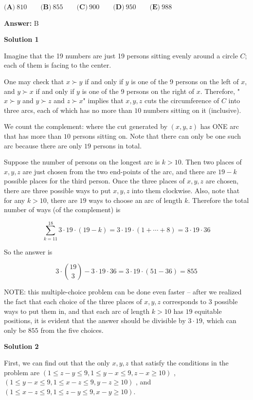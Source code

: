 \begin{enumerate}
 $\textbf{(A)} \ 810 \qquad  \textbf{(B)} \ 855 \qquad  \textbf{(C)} \ 900 \qquad  \textbf{(D)} \ 950 \qquad  \textbf{(E)} \ 988$

 \textbf{Answer: }B



\textbf{Solution 1}

Imagine that the 19 numbers are just 19 persons sitting evenly around a circle $C$; each of them is facing to the center. 

 One may check that $x \succ y$ if and only if $y$ is one of the 9 persons on the left of $x$, and $y \succ x$ if and only if $y$ is one of the 9 persons on the right of $x$. Therefore, "$x \succ y$ and $y \succ z$ and $z \succ x$" implies that $x, y, z$ cuts the circumference of $C$ into three arcs, each of which has no more than $10$ numbers sitting on it (inclusive).

 We count the complement: where the cut generated by $(x,y,z)$ has ONE arc that has more than $10$ persons sitting on. Note that there can only be one such arc because there are only $19$ persons in total.

 Suppose the number of persons on the longest arc is $k>10$. Then two places of $x,y,z$ are just chosen from the two end-points of the arc, and there are $19-k$ possible places for the third person. Once the three places of $x,y,z$ are chosen, there are three possible ways to put $x,y,z$ into them clockwise. Also, note that for any $k>10$, there are $19$ ways to choose an arc of length $k$. Therefore the total number of ways (of the complement) is 

 
 \[\sum_{k=11}^{18} 3\cdot 19 \cdot (19-k) = 3\cdot 19 \cdot (1+\cdots+8) = 3\cdot 19\cdot 36\]

 So the answer is

 
 \[3\cdot \binom{19}{3} - 3\cdot 19\cdot 36 = 3\cdot 19 \cdot (51 - 36) = 855\]

 NOTE: this multiple-choice problem can be done even faster -- after we realized the fact that each choice of the three places of $x,y,z$ corresponds to $3$ possible ways to put them in, and that each arc of length $k>10$ has $19$ equitable positions, it is evident that the answer should be divisible by $3\cdot 19$,  which can only be $855$ from the five choices.

 



\textbf{Solution 2}

First, we can find out that the only $x, y, z$ that satisfy the conditions in the problem are $(1 \leq z-y \leq 9 , 1 \leq y-x \leq 9 , z-x \geq 10)$ , $(1 \leq y-x \leq 9 , 1 \leq x-z \leq 9 , y-z \geq 10)$ , and $(1 \leq x-z \leq 9 , 1 \leq z-y \leq 9 , x-y \geq 10)$. 


\end{enumerate}
